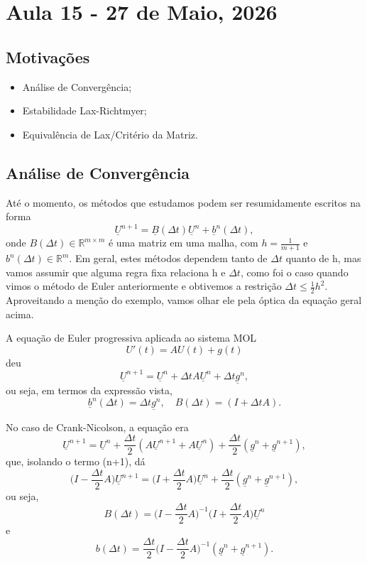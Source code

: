 \documentclass[../differential_methods.tex]{subfiles}
\begin{document}
\section{Aula 15 - 27 de Maio, 2026}
\subsection{Motivações}
\begin{itemize}
	\item Análise de Convergência;
	\item Estabilidade Lax-Richtmyer;
	\item Equivalência de Lax/Critério da Matriz.
\end{itemize}
\subsection{Análise de Convergência}
Até o momento, os métodos que estudamos podem ser resumidamente escritos na forma
\[
	\underline{U}^{n+1} = \underline{B}(\Delta t)\underline{U}^{n} + \underline{b}^{n}(\Delta t),
\]
onde \(B(\Delta t)\in \mathbb{R}^{m\times m}\) é uma matriz em uma malha, com \(h = \frac{1}{m+1}\) e \(b^{n}(\Delta t)\in \mathbb{R}^{m}\). Em geral, estes métodos dependem tanto de \(\Delta t\) quanto de h, mas vamos assumir que alguma regra fixa relaciona h e \(\Delta t\), como foi o caso quando vimos o método de Euler anteriormente e obtivemos a restrição \(\Delta t\leq \frac{1}{2}h^{2}\).
Aproveitando a menção do exemplo, vamos olhar ele pela óptica da equação geral acima.
\begin{example}
	A equação de Euler progressiva aplicada ao sistema MOL
	\[
		U'(t) = AU(t) + g(t)
	\]
	deu
	\[
		\underline{U}^{n+1} =\underline{U}^{n} + \Delta t A \underline{U}^{n} + \Delta t \underline{g}^{n},
	\]
	ou seja, em termos da expressão vista,
	\[
		\underline{b}^{n}(\Delta t) = \Delta t \underline{g}^{n}, \quad B(\Delta t) = (I+\Delta tA).
	\]
\end{example}
\begin{example}
	No caso de Crank-Nicolson, a equação era
	\[
		\underline{U}^{n+1} = \underline{U}^{n} + \frac{\Delta t}{2}(A\underline{U}^{n+1} + A \underline{U}^{n}) + \frac{\Delta t}{2}(\underline{g}^{n}+\underline{g}^{n+1}),
	\]
	que, isolando o termo (n+1), dá
	\[
		\biggl(I - \frac{\Delta t }{2}A\biggr) \underline{U}^{n+1} = \biggl(I + \frac{\Delta t}{2}A\biggr)\underline{U}^{n} + \frac{\Delta t}{2}(\underline{g}^{n} + \underline{g}^{n+1}),
	\]
	ou seja,
	\[
		B(\Delta t) = \biggl(I - \frac{\Delta t}{2}A\biggr)^{-1}\biggl(I + \frac{\Delta t}{2} A\biggr)\underline{U}^{n}
	\]
	e
	\[
		b(\Delta t) = \frac{\Delta t}{2} \biggl(I - \frac{\Delta t}{2}A\biggr)^{-1}(\underline{g}^{n}+\underline{g}^{n+1}).
	\]
\end{example}
\end{document}
